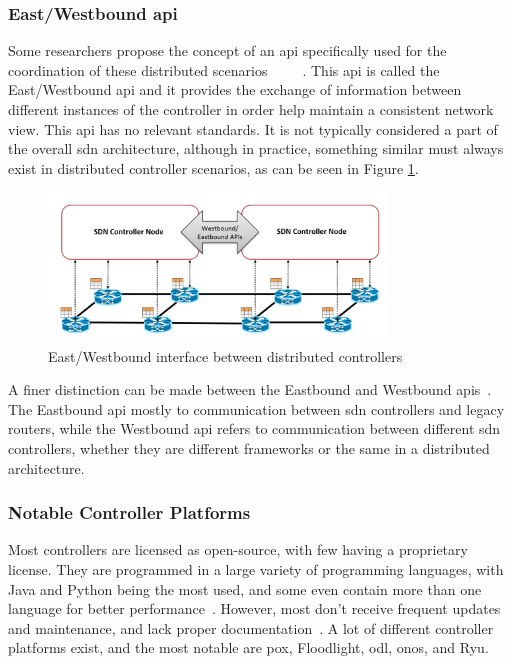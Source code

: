 \subsubsection[East/Westbound API]{East/Westbound \gls{api}}
Some researchers propose the concept of an \gls{api} specifically used for the coordination of these distributed scenarios~\cite{kreutz_software-defined_2015}~\cite{xia_survey_2015}~\cite{thyagaturu_software_2016}~\cite{latif_comprehensive_2020}~\cite{zhu_sdn_2020}. This \gls{api} is called the East/Westbound \gls{api} and it provides the exchange of information between different instances of the controller in order help maintain a consistent network view. This \gls{api} has no relevant standards. It is not typically considered a part of the overall \gls{sdn} architecture, although in practice, something similar must always exist in distributed controller scenarios, as can be seen in Figure \ref{fig:east_west}.

\begin{figure}
	\centering
	\includegraphics[width=0.8\textwidth]{Chapters/Figures/SDNs/east_west_api.png}
	\caption{East/Westbound interface between distributed controllers~\cite{kreutz_software-defined_2015}}
	\label{fig:east_west}
\end{figure}


A finer distinction can be made between the Eastbound and Westbound \glspl{api}~\cite{kreutz_software-defined_2015}. The Eastbound \gls{api} mostly to communication between \gls{sdn} controllers and legacy routers, while the Westbound \gls{api} refers to communication between different \gls{sdn} controllers, whether they are different frameworks or the same in a distributed architecture. 


\subsubsection{Notable Controller Platforms}
Most controllers are licensed as open-source, with few having a proprietary license. They are programmed in a large variety of programming languages, with Java and Python being the most used, and some even contain more than one language for better performance~\cite{zhu_sdn_2020}. However, most don't receive frequent updates and maintenance, and lack proper documentation~\cite{zhu_sdn_2020}. A lot of different controller platforms exist, and the most notable are \gls{pox}, Floodlight, \gls{odl}, \gls{onos}, and Ryu. 

